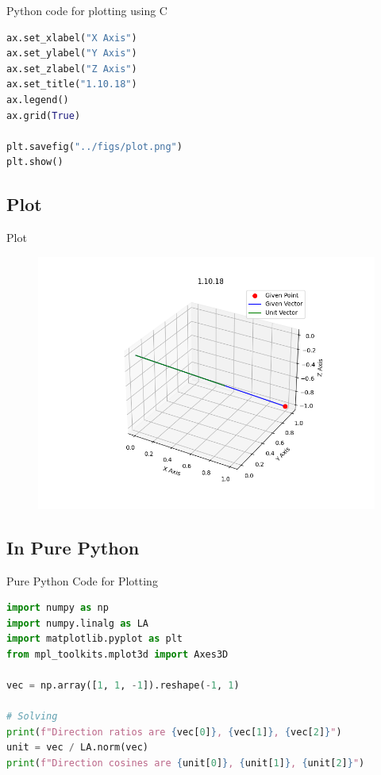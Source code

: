 \documentclass{beamer}
\theoremstyle{remark}
\numberwithin{equation}{section}
\begin{document}
\begin{frame}[fragile]{Python code for plotting using C}
 \begin{lstlisting}[language=Python]
  ax.set_xlabel("X Axis")
ax.set_ylabel("Y Axis")
ax.set_zlabel("Z Axis")
ax.set_title("1.10.18")
ax.legend()
ax.grid(True)

plt.savefig("../figs/plot.png")
plt.show()
 \end{lstlisting}
\end{frame}

\subsection{Plot}
\begin{frame}{Plot}
 \begin{figure}[H]
    \centering
    \includegraphics[width=\columnwidth]{../figs/plot.png}
    \caption*{}
    \label{fig:plot_c}
\end{figure}
\end{frame}

\subsection{In Pure Python}
\begin{frame}[fragile]{Pure Python Code for Plotting}
\begin{lstlisting}[language=Python]
import numpy as np
import numpy.linalg as LA
import matplotlib.pyplot as plt
from mpl_toolkits.mplot3d import Axes3D

vec = np.array([1, 1, -1]).reshape(-1, 1)

# Solving
print(f"Direction ratios are {vec[0]}, {vec[1]}, {vec[2]}")
unit = vec / LA.norm(vec)
print(f"Direction cosines are {unit[0]}, {unit[1]}, {unit[2]}")

\end{lstlisting}
\end{frame}
\end{document}
